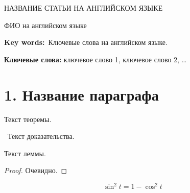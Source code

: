 
 \bigskip


 \begin{center}
 НАЗВАНИЕ СТАТЬИ НА АНГЛИЙСКОМ ЯЗЫКЕ
 \end{center}
 \begin{center}
  ФИО на английском языке
 \end{center}


\vspace*{-4pt}

{\noindent\footnotesize {\bf Key
 words:}~Ключевые слова на английском языке.\par}










{\noindent\footnotesize{\bf Ключевые
 слова:} ключевое слово 1, ключевое слово 2, \ldots\par}



\section*{1. Название параграфа}



Текст теоремы. \Endproc

\beginproof~Текст доказательства.~\endproof


Текст леммы.\Endproc




\begin{proof}
Очевидно.
\end{proof}

\begin{equation}
	\label{eq:aux}
	\sin^2 t = 1 - \cos^2 t
\end{equation}

